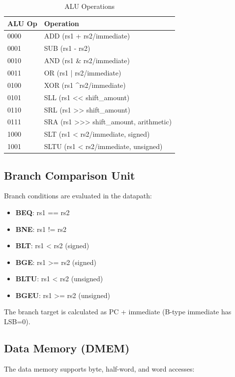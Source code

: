 \begin{table}[ht]
\centering
\caption{ALU Operations}
\label{tab:alu_ops}
\begin{tabular}{ll}
\toprule
\textbf{ALU Op} & \textbf{Operation} \\
\midrule
0000 & ADD (rs1 + rs2/immediate) \\
0001 & SUB (rs1 - rs2) \\
0010 & AND (rs1 \& rs2/immediate) \\
0011 & OR (rs1 | rs2/immediate) \\
0100 & XOR (rs1 \textasciicircum rs2/immediate) \\
0101 & SLL (rs1 << shift\_amount) \\
0110 & SRL (rs1 >> shift\_amount) \\
0111 & SRA (rs1 >>> shift\_amount, arithmetic) \\
1000 & SLT (rs1 < rs2/immediate, signed) \\
1001 & SLTU (rs1 < rs2/immediate, unsigned) \\
\bottomrule
\end{tabular}
\end{table}

\subsection{Branch Comparison Unit}

Branch conditions are evaluated in the datapath:

\begin{itemize}
    \item \textbf{BEQ}: rs1 == rs2
    \item \textbf{BNE}: rs1 != rs2
    \item \textbf{BLT}: rs1 < rs2 (signed)
    \item \textbf{BGE}: rs1 >= rs2 (signed)
    \item \textbf{BLTU}: rs1 < rs2 (unsigned)
    \item \textbf{BGEU}: rs1 >= rs2 (unsigned)
\end{itemize}

The branch target is calculated as PC + immediate (B-type immediate has LSB=0).

\subsection{Data Memory (DMEM)}

The data memory supports byte, half-word, and word accesses:

